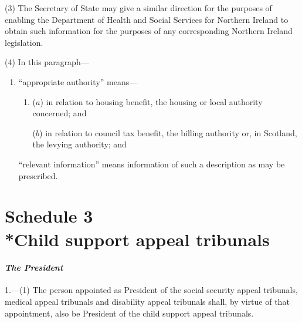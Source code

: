 \documentclass[12pt,a4paper]{article}
\begin{document}
(3) The Secretary of State may give a similar direction for the purposes of enabling the Department of Health and Social Services for Northern Ireland to obtain such information for the purposes of any corresponding Northern Ireland legislation.

(4) In this paragraph—
\begin{enumerate}\item[]
    “appropriate authority” means—
\begin{enumerate}\item[]
    ($a$) 
    in relation to housing benefit, the housing or local authority concerned; and

    ($b$) 
    in relation to 
council tax benefit, the billing authority  %
or, in Scotland, the levying authority; and
\end{enumerate}

    “relevant information” means information of such a description as may be prescribed. 
\end{enumerate}


\part[Schedule 3 --- Child support appeal tribunals]{Schedule 3\\*Child support appeal tribunals}

\renewcommand\parthead{--- Schedule 3}


\subsection*{\itshape The President}

1.---(1) The person appointed 
as President of the social security appeal tribunals, medical appeal tribunals and disability appeal tribunals shall, by virtue of that appointment, also be President of the child support appeal tribunals.
\end{document}
